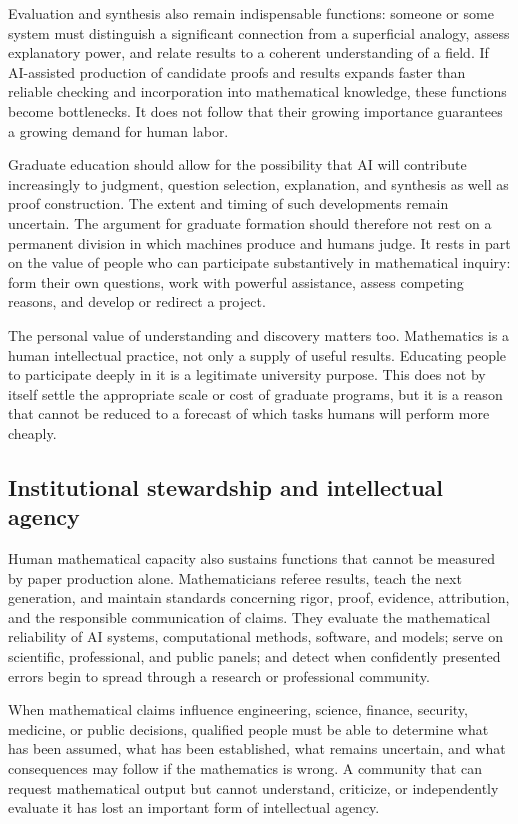 \documentclass[11pt]{article}
\begin{document}
Evaluation and synthesis also remain indispensable functions: someone or some system
must distinguish a significant connection from a superficial analogy, assess
explanatory power, and relate results to a coherent understanding of a field. If
AI-assisted production of candidate proofs and results expands faster than reliable
checking and incorporation into mathematical knowledge, these
functions become bottlenecks. It does not follow that their growing importance
guarantees a growing demand for human labor.

Graduate education should allow for the possibility that AI will contribute increasingly
to judgment, question selection, explanation, and synthesis as well as proof construction.
The extent and timing of such developments remain uncertain. The argument for graduate
formation should therefore not rest on a permanent division in which machines produce
and humans judge. It rests in part on the
value of people who can participate substantively in mathematical inquiry: form their
own questions, work with powerful assistance, assess competing reasons, and develop or
redirect a project.

The personal value of understanding and discovery matters too. Mathematics is a human
intellectual practice, not only a supply of useful results. Educating people to
participate deeply in it is a legitimate university purpose. This does not by itself
settle the appropriate scale or cost of graduate programs, but it is a reason that
cannot be reduced to a forecast of which tasks humans will perform more cheaply.

\subsection{Institutional stewardship and intellectual agency}

Human mathematical capacity also sustains functions that cannot be measured by paper
production alone.  Mathematicians referee results, teach the next generation, and
maintain standards concerning rigor, proof, evidence, attribution, and the responsible
communication of claims.  They evaluate the mathematical reliability of AI systems,
computational methods, software, and models; serve on scientific, professional, and
public panels; and detect when confidently presented errors begin to spread through a
research or professional community.

When mathematical claims influence engineering, science, finance, security, medicine, or
public decisions, qualified people must be able to determine what has been assumed, what
has been established, what remains uncertain, and what consequences may follow if the
mathematics is wrong.  A community that can request mathematical output but cannot
understand, criticize, or independently evaluate it has lost an important form of
intellectual agency.
\end{document}

